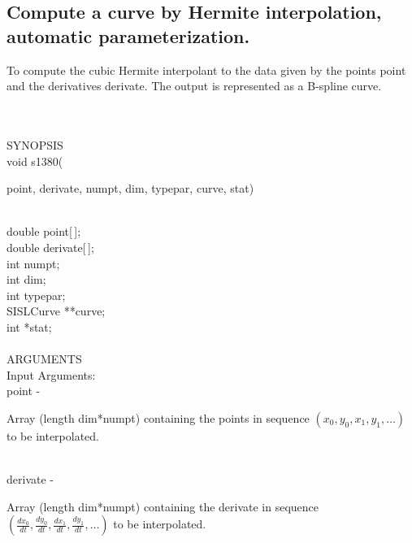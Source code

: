 \subsection{\sloppy Compute a curve by Hermite interpolation, automatic parameteriza\-tion.}
\begin{minipg1}
  To compute the cubic Hermite interpolant to the data given by the points
  point and the derivatives derivate.
 The output is represented as a B-spline curve.
\end{minipg1}\\ \\
SYNOPSIS\\
        \>void s1380(\begin{minipg3}
                {\fov point}, {\fov derivate}, {\fov numpt}, {\fov dim}, {\fov typepar}, {\fov curve}, {\fov stat})
                \end{minipg3}\\
                \>\>    double  \>      {\fov point}[\,];\\
                \>\>    double  \>      {\fov derivate}[\,];\\
                \>\>    int     \>      {\fov numpt};\\
                \>\>    int     \>      {\fov dim};\\
                \>\>    int     \>      {\fov typepar};\\
                \>\>    SISLCurve       \>      **{\fov curve};\\
                \>\>    int     \>      *{\fov stat};\\
\\
ARGUMENTS\\
        \>Input Arguments:\\
        \>\>    {\fov point}    \> - \> \begin{minipg2}
                                Array (length dim*numpt) containing the
                                points in sequence
                                $(x_{0},y_{0},x_{1},y_{1},\ldots)$
                                to be interpolated.
                                \end{minipg2}\\[0.3ex]
        \>\>    {\fov derivate}\> - \>  \begin{minipg2}
                                Array (length dim*numpt) containing the
                                derivate in sequence
                                $(\frac{dx_{0}}{dt},\frac{dy_{0}}{dt},
                                \frac{dx_{1}}{dt},\frac{dy_{1}}{dt},\ldots)$
                                to be interpolated.
                                \end{minipg2}\\[0.3ex]
